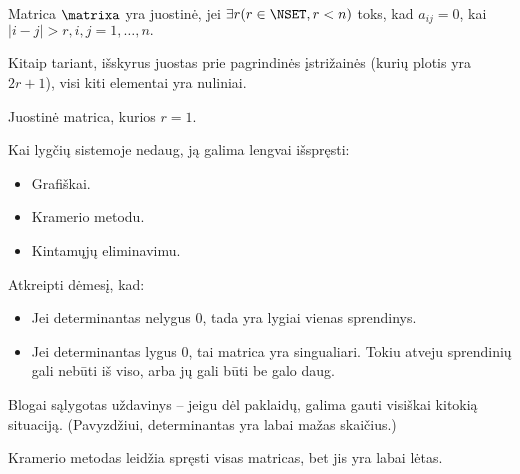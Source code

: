 \begin{defn}
  Matrica $\matrixa$ yra juostinė, jei $\exists r (r \in \NSET, r < n)$ toks, kad
  $a_{ij} = 0$, kai $|i-j|>r, i, j = 1,\ldots,n.$

  Kitaip tariant, išskyrus juostas prie pagrindinės įstrižainės (kurių plotis
  yra $2r + 1$), visi kiti elementai yra nuliniai.
\end{defn}
\begin{defn}
  Juostinė matrica, kurios $r = 1$.
\end{defn}

Kai lygčių sistemoje nedaug, ją galima lengvai išspręsti:
\begin{itemize}
  \item Grafiškai.
  \item Kramerio metodu.
  \item Kintamųjų eliminavimu.
\end{itemize}

Atkreipti dėmesį, kad:
\begin{itemize}
  \item Jei determinantas nelygus 0, tada yra lygiai vienas sprendinys.
  \item Jei determinantas lygus 0, tai matrica yra singualiari. Tokiu
    atveju sprendinių gali nebūti iš viso, arba jų gali būti be
    galo daug.
\end{itemize}


Blogai sąlygotas uždavinys – jeigu dėl paklaidų, galima gauti visiškai
kitokią situaciją. (Pavyzdžiui, determinantas yra labai mažas skaičius.)


Kramerio metodas leidžia spręsti visas matricas, bet jis yra labai
lėtas.

